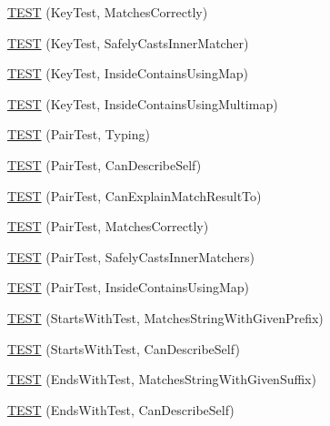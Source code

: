 \begin{DoxyCompactItemize}
\mbox{\hyperlink{namespacetesting_1_1gmock__matchers__test_a39f4f76617c414ab715b701eb82eeee4}{T\+E\+ST}} (Key\+Test, Matches\+Correctly)
\item 
\mbox{\hyperlink{namespacetesting_1_1gmock__matchers__test_a6b05d274d57a4aa120bb497c34ce3a68}{T\+E\+ST}} (Key\+Test, Safely\+Casts\+Inner\+Matcher)
\item 
\mbox{\hyperlink{namespacetesting_1_1gmock__matchers__test_af9f4e295413489a7e3acafc59584c3c4}{T\+E\+ST}} (Key\+Test, Inside\+Contains\+Using\+Map)
\item 
\mbox{\hyperlink{namespacetesting_1_1gmock__matchers__test_af90ca00690094484af6c34eadf4dd7c3}{T\+E\+ST}} (Key\+Test, Inside\+Contains\+Using\+Multimap)
\item 
\mbox{\hyperlink{namespacetesting_1_1gmock__matchers__test_a5689064ea3fe50424dd1ea036d107aa8}{T\+E\+ST}} (Pair\+Test, Typing)
\item 
\mbox{\hyperlink{namespacetesting_1_1gmock__matchers__test_a672ba279448f634fae495ed7dc9260bd}{T\+E\+ST}} (Pair\+Test, Can\+Describe\+Self)
\item 
\mbox{\hyperlink{namespacetesting_1_1gmock__matchers__test_a4ee8f3967e3658cd7bd340558922f131}{T\+E\+ST}} (Pair\+Test, Can\+Explain\+Match\+Result\+To)
\item 
\mbox{\hyperlink{namespacetesting_1_1gmock__matchers__test_acdb02e9ac603c91b35602751f6a81239}{T\+E\+ST}} (Pair\+Test, Matches\+Correctly)
\item 
\mbox{\hyperlink{namespacetesting_1_1gmock__matchers__test_ad2110445fe8f2f8ca947540f2a400228}{T\+E\+ST}} (Pair\+Test, Safely\+Casts\+Inner\+Matchers)
\item 
\mbox{\hyperlink{namespacetesting_1_1gmock__matchers__test_a9785412a9e786b1f81387204df577c73}{T\+E\+ST}} (Pair\+Test, Inside\+Contains\+Using\+Map)
\item 
\mbox{\hyperlink{namespacetesting_1_1gmock__matchers__test_ac8a66c592ff57cce28b6f1d5211fd370}{T\+E\+ST}} (Starts\+With\+Test, Matches\+String\+With\+Given\+Prefix)
\item 
\mbox{\hyperlink{namespacetesting_1_1gmock__matchers__test_a492143bbe0627c563c5d0c65bf3f4d5b}{T\+E\+ST}} (Starts\+With\+Test, Can\+Describe\+Self)
\item 
\mbox{\hyperlink{namespacetesting_1_1gmock__matchers__test_ac3d41540d2ae7956d33c9eae1be67d91}{T\+E\+ST}} (Ends\+With\+Test, Matches\+String\+With\+Given\+Suffix)
\item 
\mbox{\hyperlink{namespacetesting_1_1gmock__matchers__test_a80da065ed9f5fb87add88ae2bc14056d}{T\+E\+ST}} (Ends\+With\+Test, Can\+Describe\+Self)

\end{DoxyCompactItemize}
